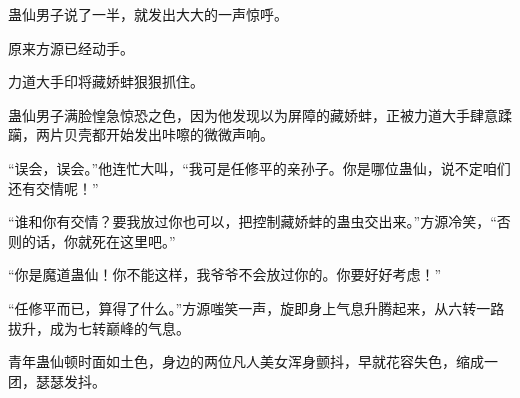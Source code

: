 \begin{this_body}
蛊仙男子说了一半，就发出大大的一声惊呼。

原来方源已经动手。

力道大手印将藏娇蚌狠狠抓住。

蛊仙男子满脸惶急惊恐之色，因为他发现以为屏障的藏娇蚌，正被力道大手肆意蹂躏，两片贝壳都开始发出咔嚓的微微声响。

“误会，误会。”他连忙大叫，“我可是任修平的亲孙子。你是哪位蛊仙，说不定咱们还有交情呢！”

“谁和你有交情？要我放过你也可以，把控制藏娇蚌的蛊虫交出来。”方源冷笑，“否则的话，你就死在这里吧。”

“你是魔道蛊仙！你不能这样，我爷爷不会放过你的。你要好好考虑！”

“任修平而已，算得了什么。”方源嗤笑一声，旋即身上气息升腾起来，从六转一路拔升，成为七转巅峰的气息。

青年蛊仙顿时面如土色，身边的两位凡人美女浑身颤抖，早就花容失色，缩成一团，瑟瑟发抖。

\end{this_body}

